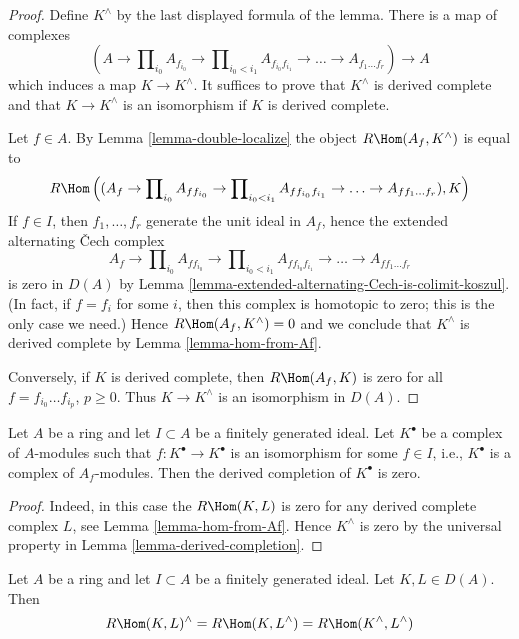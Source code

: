 \begin{proof}
Define $K^\wedge$ by the last displayed formula of the lemma.
There is a map of complexes
$$
(A \to \prod\nolimits_{i_0} A_{f_{i_0}} \to
\prod\nolimits_{i_0 < i_1} A_{f_{i_0}f_{i_1}} \to
\ldots \to A_{f_1\ldots f_r}) \longrightarrow A
$$
which induces a map $K \to K^\wedge$. It suffices to prove that
$K^\wedge$ is derived complete and that $K \to K^\wedge$ is an
isomorphism if $K$ is derived complete.

\medskip\noindent
Let $f \in A$. By Lemma \ref{lemma-double-localize}
the object $R\Hom(A_f, K^\wedge)$ is equal to
$$
R\Hom\left((A_f \to \prod\nolimits_{i_0} A_{ff_{i_0}} \to
\prod\nolimits_{i_0 < i_1} A_{ff_{i_0}f_{i_1}} \to
\ldots \to A_{ff_1\ldots f_r}), K\right)
$$
If $f \in I$, then $f_1, \ldots, f_r$ generate the
unit ideal in $A_f$, hence the extended alternating
{\v C}ech complex
$$
A_f \to \prod\nolimits_{i_0} A_{ff_{i_0}} \to
\prod\nolimits_{i_0 < i_1} A_{ff_{i_0}f_{i_1}} \to
\ldots \to A_{ff_1\ldots f_r}
$$
is zero in $D(A)$ by
Lemma \ref{lemma-extended-alternating-Cech-is-colimit-koszul}.
(In fact, if $f = f_i$ for some $i$, then this complex
is homotopic to zero; this is the only case we need.)
Hence $R\Hom(A_f, K^\wedge) = 0$ and we conclude that
$K^\wedge$ is derived complete by Lemma \ref{lemma-hom-from-Af}.

\medskip\noindent
Conversely, if $K$ is derived complete, then $R\Hom(A_f, K)$
is zero for all $f = f_{i_0} \ldots f_{i_p}$, $p \geq 0$. Thus
$K \to K^\wedge$ is an isomorphism in $D(A)$.
\end{proof}

\begin{lemma}
\label{lemma-derived-completion-vanishes}
Let $A$ be a ring and let $I \subset A$ be a finitely generated ideal.
Let $K^\bullet$ be a complex of $A$-modules such that
$f : K^\bullet \to K^\bullet$ is an isomorphism for some
$f \in I$, i.e., $K^\bullet$ is a complex of $A_f$-modules. Then
the derived completion of $K^\bullet$ is zero.
\end{lemma}

\begin{proof}
Indeed, in this case the $R\Hom(K, L)$ is zero for any derived complete
complex $L$, see
Lemma \ref{lemma-hom-from-Af}. Hence $K^\wedge$ is zero by the
universal property in Lemma \ref{lemma-derived-completion}.
\end{proof}

\begin{lemma}
\label{lemma-completion-RHom}
Let $A$ be a ring and let $I \subset A$ be a finitely generated ideal.
Let $K, L \in D(A)$. Then
$$
R\Hom(K, L)^\wedge = R\Hom(K, L^\wedge) = R\Hom(K^\wedge, L^\wedge)
$$
\end{lemma}

